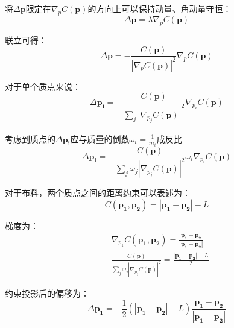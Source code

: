 \documentclass{CLGPY}
\begin{document}
\begin{multicols}{2}
		将$\Delta \pmb{p}$限定在$\nabla_pC(\pmb{p})$的方向上可以保持动量、角动量守恒：
        \begin{equation}
			\Delta \pmb{p} = \lambda \nabla_pC(\pmb{p})
        \end{equation}

		联立可得：
        \begin{equation}
			\Delta \pmb{p} = -\frac{C(\pmb{p})}{\left | \nabla_pC(\pmb{p}) \right | ^2}\nabla_pC(\pmb{p})
        \end{equation}

		对于单个质点来说：
        \begin{equation}
		\Delta \pmb{p_i} = -\frac{C(\pmb{p})}{\sum_{j} \left | \nabla_{p_j}C(\pmb{p}) \right | ^2}\nabla_{p_i}C(\pmb{p})
        \end{equation}

		考虑到质点的$\Delta \pmb{p_i}$应与质量的倒数$\omega_i=\frac{1}{m_i}$成反比
        \begin{equation}
\Delta \pmb{p_i} = -\frac{C(\pmb{p})}{\sum_{j} \omega_j\left | \nabla_{p_j}C(\pmb{p}) \right | ^2}\omega_i\nabla_{p_i}C(\pmb{p})
        \end{equation}

		对于布料，两个质点之间的距离约束可以表述为：
        \begin{equation}
			C(\pmb{p_1},\pmb{p_2})=\left | \pmb{p_1}-\pmb{p_2} \right |-L
        \end{equation}

		梯度为：
		\begin{equation}
		\begin{split}
			&\nabla_{p_1}C(\pmb{p_1},\pmb{p_2})=\frac{\pmb{p_1}-\pmb{p_2}}{\left | \pmb{p_1}-\pmb{p_2} \right |}\\
			&\frac{C(\pmb{p})}{\sum_{j} \omega_j\left | \nabla_{p_j}C(\pmb{p}) \right | ^2} = \frac{\left | \pmb{p_1}-\pmb{p_2} \right |-L}{2}
		\end{split}
		\end{equation}

		约束投影后的偏移为：
        \begin{equation}
		\Delta \pmb{p_1} =-\frac{1}{2}(\left | \pmb{p_1}-\pmb{p_2} \right |-L)\frac{\pmb{p_1}-\pmb{p_2}}{\left | \pmb{p_1}-\pmb{p_2} \right |}
        \end{equation}


\end{multicols}
\end{document}
